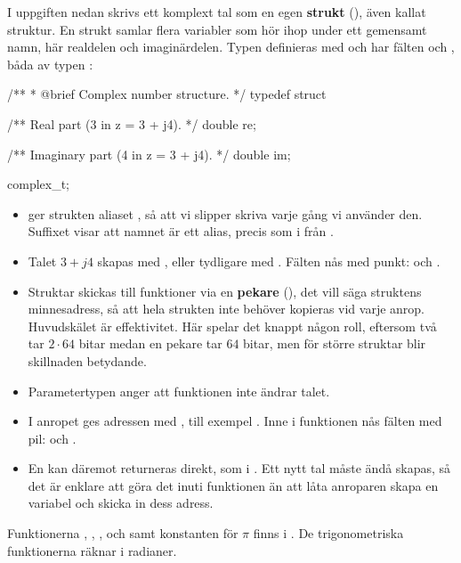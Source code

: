 I uppgiften nedan skrivs ett komplext tal som en egen \textbf{strukt} (), även kallat
struktur. En strukt samlar flera variabler som hör ihop under ett gemensamt namn, här realdelen och
imaginärdelen. Typen  definieras med  och har fälten 
och , båda av typen :
\begin{ccode}
/**
 * @brief Complex number structure.
 */
typedef struct
{
    /** Real part (3 in z = 3 + j4). */
    double re;

    /** Imaginary part (4 in z = 3 + j4). */
    double im;
} complex_t;
\end{ccode}
\begin{itemize}
  \item {} ger strukten aliaset , så att vi slipper skriva 
    varje gång vi använder den. Suffixet  visar att namnet är ett alias, precis som i
     från .
  \item Talet $3 + j4$ skapas med , eller tydligare med
    . Fälten nås med punkt:  och
    .
  \item Struktar skickas till funktioner via en \textbf{pekare} (), det vill säga
    struktens minnesadress, så att hela strukten inte behöver kopieras vid varje anrop. Huvudskälet
    är effektivitet. Här spelar det knappt någon roll, eftersom två  tar $2 \cdot 64$
    bitar medan en pekare tar $64$ bitar, men för större struktar blir skillnaden betydande.
  \item Parametertypen  anger att funktionen inte ändrar talet.
  \item I anropet ges adressen med \code{&}, till exempel . Inne i
    funktionen nås fälten med pil:  och .
  \item En  kan däremot returneras direkt, som i . Ett
    nytt tal måste ändå skapas, så det är enklare att göra det inuti funktionen än att låta
    anroparen skapa en variabel och skicka in dess adress.
\end{itemize}

Funktionerna , , ,  och  samt
konstanten  för $\pi$ finns i . De trigonometriska funktionerna räknar i
radianer.

